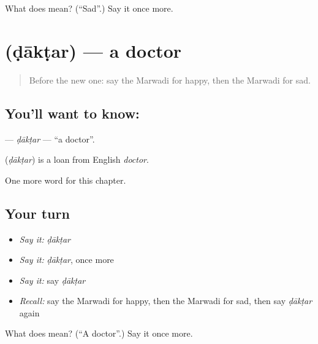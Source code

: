 \begin{tcolorbox}[breakable,colback=teal!4,colframe=teal!35!black,title={Before you move on}]
What does  mean? (\textquotedblleft{}Sad\textquotedblright{}.) Say it once more.
\end{tcolorbox}
\section[\texorpdfstring{\mw{डाक्टर} (ḍākṭar)}{डाक्टर (ḍākṭar)}]{ (ḍākṭar) — a doctor}

\label{lesson:MW-C48-daktar}



\begin{quote}
Before the new one: say the Marwadi for happy, then the Marwadi for sad.
\end{quote}

\subsection*{You'll want to know: }
\textbf{} — \emph{ḍākṭar} — \textquotedblleft{}a doctor\textquotedblright{}.

\begin{cousinweb}
\textbf{} (\emph{ḍākṭar}) is a loan from English \emph{doctor}.
\end{cousinweb}

\begin{grammarlens}[title={What you've built}]
One more word for this chapter.
\end{grammarlens}

\subsection*{Your turn}
\begin{itemize}
\raggedright
  \item \emph{Say it:} \emph{ḍākṭar}
  \item \emph{Say it:} \emph{ḍākṭar}, once more
  \item \emph{Say it:} say \emph{ḍākṭar}
  \item \emph{Recall:} say the Marwadi for happy, then the Marwadi for sad, then say \emph{ḍākṭar} again
\end{itemize}

\begin{tcolorbox}[breakable,colback=teal!4,colframe=teal!35!black,title={Before you move on}]
What does  mean? (\textquotedblleft{}A doctor\textquotedblright{}.) Say it once more.
\end{tcolorbox}
